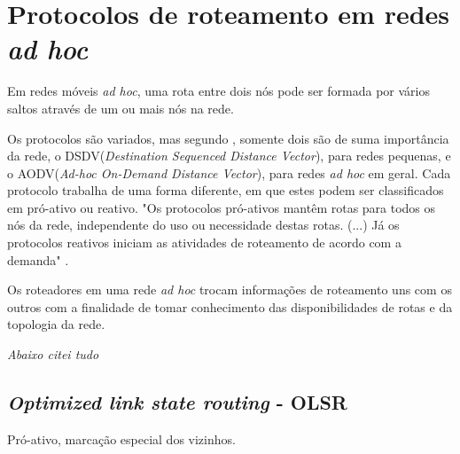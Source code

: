 \section{Protocolos de roteamento em redes \textit{ad hoc}}
Em redes m\'oveis \textit{ad hoc}, uma rota entre dois n\'os pode ser formada por v\'arios saltos atrav\'es de um ou mais n\'os na rede. 

Os protocolos s\~ao variados, mas segundo \cite{gorantala}, somente dois s\~ao de suma import\^ancia da rede, o DSDV(\textit{Destination Sequenced Distance Vector}), para redes pequenas, e o AODV(\textit{Ad-hoc On-Demand Distance Vector}), para redes \textit{ad hoc} em geral. 
Cada protocolo trabalha de uma forma diferente, em que estes podem ser classificados em pr\'o-ativo ou reativo. 
"Os protocolos pr\'o-ativos mant\^em rotas para todos os n\'os da rede, independente do uso ou necessidade destas rotas. (...) J\'a os protocolos reativos iniciam as atividades de roteamento de acordo com a demanda" \cite{pereira}.

Os roteadores em uma rede \textit{ad hoc} trocam informa\c{c}\~oes de roteamento uns com os outros com a finalidade de tomar conhecimento das disponibilidades de rotas e da topologia da rede.\cite{pereira}

\textit{Abaixo citei tudo \cite{gorantala}}


\subsection{\textit{Optimized link state routing} - OLSR}
Pr\'o-ativo, marca\c{c}\~ao especial dos vizinhos.
